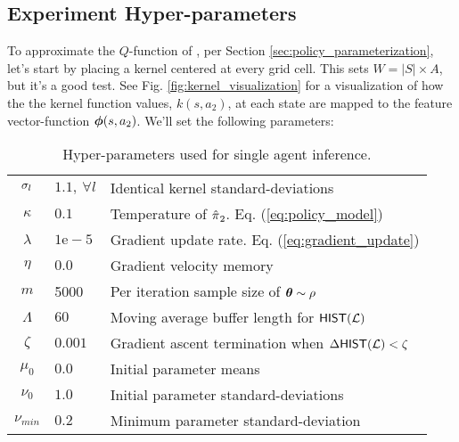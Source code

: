     \begin{figure}[htb]
        \begin{center}

        \end{center}
    \end{figure}

    \subsection{Experiment Hyper-parameters}
    To approximate the $Q$-function of , per Section \ref{sec:policy_parameterization}, let's start
    by placing a kernel centered at every grid cell. This sets $W=|S|\times A$, but it's a good test. See Fig.
    \ref{fig:kernel_visualization} for a visualization of how the the kernel function values, $k(s,a_2)$, at each state
    are mapped to the feature vector-function $\boldsymbol{\mathbb{\phi}}(s, a_2)$. We'll set the following parameters:

    \begin{table}[H]
        \centering
        \begin{tabular}{c|l l}
                $\sigma_{l}$ & $1.1,\ \forall l$ & Identical kernel standard-deviations\\
                $\kappa$ & $0.1$ & Temperature of $\hat{\pi_{}}_2$. Eq. (\ref{eq:policy_model}) \\
                $\lambda$ & $1\mathrm{e}\!-\!5$ & Gradient update rate. Eq. (\ref{eq:gradient_update}) \\
                $\eta$ & $0.0$ & Gradient velocity memory\\
                $m$ & 5000 & Per iteration sample size of $\boldsymbol{\mathbb{\theta}}\sim \rho$\\
                $\Lambda$ & $60$ & Moving average buffer length for $\mathsf{HIST}(\mathcal{L})$ \\
                $\zeta$ & $0.001$ & Gradient ascent termination when $\Delta\mathsf{HIST}(\mathcal{L}) < \zeta$\\
                    $\mu_{0}$ & $0.0$ & Initial parameter means\\
                $\nu_{0}$ & $1.0$ & Initial parameter standard-deviations\\
                $\nu_{min}$ & $0.2$ & Minimum parameter standard-deviation\\
        \end{tabular}
        \caption{Hyper-parameters used for single agent inference.}
        \label{table:single_agent_hyper_params}
    \end{table}

